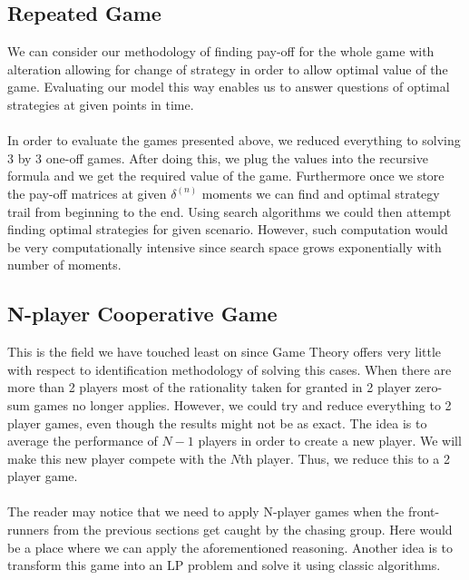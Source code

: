 \documentclass[10pt, a4paper]{report}
\begin{document}
\subsection{Repeated Game}\label{subsec:repgame}
We can consider our methodology of finding pay-off for the whole game with alteration allowing for change of strategy in order to allow optimal value of the game. Evaluating our model this way enables us to answer questions of optimal strategies at given points in time.\\\\
In order to evaluate the games presented above, we reduced everything to solving 3 by 3 one-off games. After doing this, we plug the values into the recursive formula and we get the required value of the game. Furthermore once we store the pay-off matrices at given $\delta^{(n)}$ moments we can find and optimal strategy trail from beginning to the end. Using search algorithms we could then attempt finding optimal strategies for given scenario. However, such computation would be very computationally intensive since search space grows exponentially with number of moments.

\subsection{N-player Cooperative Game}\label{subsec:nplaycoopgame}
This is the field we have touched least on since Game Theory offers very little with respect to identification methodology of solving this cases. When there are more than 2 players most of the rationality taken for granted in 2 player zero-sum games no longer applies. However, we could try and reduce everything to 2 player games, even though the results might not be as exact. The idea is to average the performance of $N-1$ players in order to create a new player. We will make this new player compete with the $N$th player. Thus, we reduce this to a 2 player game.\\\\
The reader may notice that we need to apply N-player games when the front-runners from the previous sections get caught by the chasing group. Here would be a place where we can apply the aforementioned reasoning. Another idea is to transform this game into an LP problem and solve it using classic algorithms.
\end{document}
